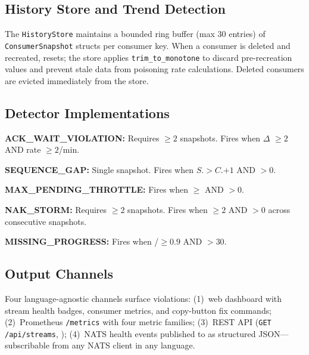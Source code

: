 \documentclass[sigconf,nonacm]{acmart}
\begin{document}
\subsection{History Store and Trend Detection}

The \texttt{HistoryStore} maintains a bounded ring buffer (max 30 entries)
of \texttt{ConsumerSnapshot} structs per consumer key. When a consumer is
deleted and recreated,  resets; the store applies
\texttt{trim\_to\_monotone} to discard pre-recreation values and prevent
stale data from poisoning rate calculations. Deleted consumers are evicted
immediately from the store.

\subsection{Detector Implementations}

\textbf{ACK\_\allowbreak WAIT\_\allowbreak VIOLATION:} Requires $\geq 2$ snapshots. Fires when
$\Delta$ $\geq 2$ AND rate $\geq 2$/min.

\textbf{SEQUENCE\_GAP:} Single snapshot. Fires when
$S$.${}>C$.$+1$
AND ${}>0$.

\textbf{MAX\_\allowbreak PENDING\_\allowbreak THROTTLE:} Fires when
${}\geq$ AND
${}>0$.

\textbf{NAK\_STORM:} Requires $\geq 2$ snapshots. Fires when
${}\geq 2$ AND ${}>0$
across consecutive snapshots.

\textbf{MISSING\_PROGRESS:} Fires when
/${}\geq 0.9$
AND ${}>30$.

\subsection{Output Channels}

Four language-agnostic channels surface violations:
(1)~web dashboard with stream health badges, consumer metrics, and
copy-button fix commands;
(2)~Prometheus \texttt{/metrics} with four metric families;
(3)~REST API (\texttt{GET /api/streams},
);
(4)~NATS health events published to
as structured JSON---subscribable from any NATS client in any language.
\end{document}
